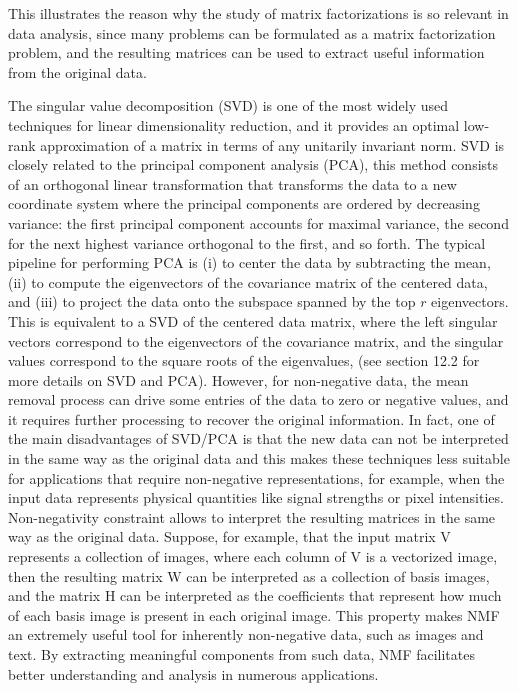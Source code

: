 This illustrates the reason why the study of matrix factorizations is so relevant in data analysis, since many problems can be formulated as a matrix factorization problem, and the resulting matrices can be used to extract useful information from the original data.
\par
The singular value decomposition (SVD) is one of the most widely used techniques for linear dimensionality reduction, and it provides an optimal low-rank approximation of a matrix in terms of any unitarily invariant norm. SVD is closely related to
the principal component analysis (PCA),
this method consists of an orthogonal linear transformation that transforms the data to a new coordinate system where the principal components are ordered by decreasing variance: the first principal component accounts for maximal variance, the second for the next highest variance orthogonal to the first, and so forth.
The typical pipeline for performing PCA is (i) to center the data by subtracting the mean, (ii) to compute the eigenvectors of the covariance matrix of the centered data, and (iii) to project the data onto the subspace spanned by the top $r$ eigenvectors.
This is equivalent to a SVD of the centered data matrix, where the left singular vectors correspond to the eigenvectors of the covariance matrix, and the singular values correspond to the square roots of the eigenvalues, (see \cite{IntroToSL} section 12.2 for more details on SVD and PCA).
However, for non-negative data, the mean removal process can drive some entries of the data to zero or negative values, and it requires further processing to recover the original information.
In fact, one of the main disadvantages of SVD/PCA is that the new data can not be interpreted in the same way as the original data and this makes these techniques less suitable for applications that require non-negative representations, for example, when the input data represents physical quantities like signal strengths or pixel intensities. 
Non-negativity constraint allows to interpret the resulting matrices in the same way
as the original data.  
Suppose, for example, that the input matrix V represents a
collection of images, where each column of V is a vectorized image, then the resulting
matrix W can be interpreted as a collection of basis images, and the matrix H can
be interpreted as the coefficients that represent how much of each basis image is
present in each original image.
This property makes NMF an extremely useful tool for inherently non-negative
data, such as images and text. By extracting meaningful components from such
data, NMF facilitates better understanding and analysis in numerous applications.

